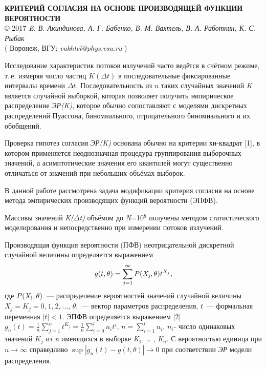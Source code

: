 \begin{center}{ \bf  КРИТЕРИЙ СОГЛАСИЯ НА ОСНОВЕ ПРОИЗВОДЯЩЕЙ ФУНКЦИИ ВЕРОЯТНОСТИ}\\
{\copyright} 2017 {\it  E. В. Акиндинова, А. Г. Бабенко, В. М. Вахтель,
В. А. Работкин, К. С. Рыбак} \\
( Воронеж, ВГУ; {\it vakhtel@phys.vsu.ru} )
\end{center}

Исследование характеристик потоков излучений часто ведётся в счётном режиме,
т.\,е. измеряя число частиц $K(\Delta t)$  в последовательные фиксированные интервалы времени $\Delta t$.
Последовательность из $n$ таких случайных значений \textit{K} является случайной выборкой, которая позволяет получить эмпирическое распределение \textit{ЭР(K)}, которое обычно сопоставляют с моделями дискретных распределений Пуассона, биномиального, отрицательного биномиального и их обобщений.

Проверка гипотез согласия \textit{ЭР(K)} основана обычно на критерии хи-квадрат [1], в котором применяется неоднозначная процедура группирования выборочных значений, а асимптотические значения его квантилей могут существенно отличаться от значений при небольших объёмах выборок.

В данной работе рассмотрена задача модификации критерия согласия на основе метода эмпирических производящих функций вероятности (ЭПФВ).

Массивы значений \textit{K($\Delta$t)} объёмом до \textit{N}=10${}^{8}$ получены методом статистического моделирования и непосредственно при измерении потоков излучений.

Производящая функция вероятности (ПФВ) неотрицательной дискретной случайной величины определяется выражением
\[g(t,\theta )=\sum _{j=1}^{\infty }P(X_{{\rm j}} ,\theta )t^{X_{j} }  ,\]
где $P(X_{{\rm j}} ,\theta )$~--- распределение вероятностей значений случайной величины
$X_{j} =K_{j} =0,_{} 1,_{} 2,_{} ...$, $\theta $,~--- вектор параметров распределения,
$t$~--- формальная переменная $\left|t\right|<1$.
ЭПФВ определяется выражением [2]
$g_{n} (t)=\frac{1}{n} \sum _{j=1}^{n}t^{K_{j} }  =\frac{1}{n} \sum _{i=0}^{l}n_{i} t^{i}  $, $n=\sum _{i=1}^{l}n_{i}  $,  $n_{i} $- число одинаковых значений $K_{j} $ из \textit{n} имеющихся в выборке \textit{K}${}_{1}$,  {\dots} , \textit{K${}_{n}$}. С вероятностью единица при $n\to \infty $ справедливо $\sup \left|g_{n} (t)-g(t,\theta )\right|\to 0$ при соответствии \textit{ЭР} модели распределения.

